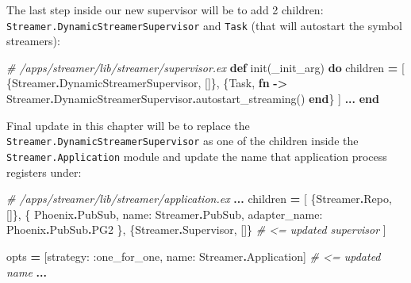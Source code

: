 \documentclass[
]{book}
\newenvironment{Shaded}{\begin{snugshade}}{\end{snugshade}}
\newcommand{\CommentTok}[1]{\textcolor[rgb]{0.56,0.35,0.01}{\textit{#1}}}
\newcommand{\ConstantTok}[1]{\textcolor[rgb]{0.00,0.00,0.00}{#1}}
\newcommand{\KeywordTok}[1]{\textcolor[rgb]{0.13,0.29,0.53}{\textbf{#1}}}
\newcommand{\NormalTok}[1]{#1}
\newcommand{\OperatorTok}[1]{\textcolor[rgb]{0.81,0.36,0.00}{\textbf{#1}}}
\newcommand{\VariableTok}[1]{\textcolor[rgb]{0.00,0.00,0.00}{#1}}
\begin{document}
The last step inside our new supervisor will be to add 2 children: \texttt{Streamer.DynamicStreamerSupervisor} and \texttt{Task} (that will autostart the symbol streamers):

\begin{Shaded}
\begin{Highlighting}[]
\CommentTok{\# /apps/streamer/lib/streamer/supervisor.ex}
  \KeywordTok{def}\NormalTok{ init(\_init\_arg) }\KeywordTok{do}
\NormalTok{    children }\OperatorTok{=}\NormalTok{ [}
\NormalTok{      \{}\ConstantTok{Streamer}\OperatorTok{.}\ConstantTok{DynamicStreamerSupervisor}\NormalTok{, []\},}
\NormalTok{      \{}\ConstantTok{Task}\NormalTok{,}
       \KeywordTok{fn} \OperatorTok{{-}\textgreater{}}
         \ConstantTok{Streamer}\OperatorTok{.}\ConstantTok{DynamicStreamerSupervisor}\OperatorTok{.}\NormalTok{autostart\_streaming()}
       \KeywordTok{end}\NormalTok{\}}
\NormalTok{    ]}
    \OperatorTok{...}
  \KeywordTok{end}
\end{Highlighting}
\end{Shaded}

Final update in this chapter will be to replace the \texttt{Streamer.DynamicStreamerSupervisor} as one of the children inside the \texttt{Streamer.Application} module and update the name that application process registers under:

\begin{Shaded}
\begin{Highlighting}[]
\CommentTok{\# /apps/streamer/lib/streamer/application.ex}
    \OperatorTok{...}
\NormalTok{    children }\OperatorTok{=}\NormalTok{ [}
\NormalTok{      \{}\ConstantTok{Streamer}\OperatorTok{.}\ConstantTok{Repo}\NormalTok{, []\},}
\NormalTok{      \{}
        \ConstantTok{Phoenix}\OperatorTok{.}\ConstantTok{PubSub}\NormalTok{,}
        \VariableTok{name:} \ConstantTok{Streamer}\OperatorTok{.}\ConstantTok{PubSub}\NormalTok{, }\VariableTok{adapter\_name:} \ConstantTok{Phoenix}\OperatorTok{.}\ConstantTok{PubSub}\OperatorTok{.}\ConstantTok{PG2}
\NormalTok{      \},}
\NormalTok{      \{}\ConstantTok{Streamer}\OperatorTok{.}\ConstantTok{Supervisor}\NormalTok{, []\} }\CommentTok{\# \textless{}= updated supervisor}
\NormalTok{    ]}

\NormalTok{    opts }\OperatorTok{=}\NormalTok{ [}\VariableTok{strategy:} \VariableTok{:one\_for\_one}\NormalTok{, }\VariableTok{name:} \ConstantTok{Streamer}\OperatorTok{.}\ConstantTok{Application}\NormalTok{] }\CommentTok{\# \textless{}= updated name}
    \OperatorTok{...}
\end{Highlighting}
\end{Shaded}
\end{document}
